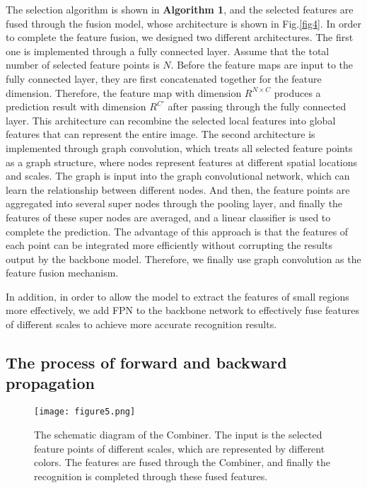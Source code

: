 \documentclass[conference]{IEEEtran}
\begin{document}
The selection algorithm is shown in \textbf{Algorithm 1}, and the selected features are fused through the fusion model, whose architecture is shown in Fig.\ref{fig4}. In order to complete the feature fusion, we designed two different architectures. The first one is implemented through a fully connected layer. Assume that the total number of selected feature points is $N$. Before the feature maps are input to the fully connected layer, they are first concatenated together for the feature dimension. Therefore, the feature map with dimension $ R^{N \times C} $  produces a prediction result with dimension $R^{C\prime}$ after passing through the fully connected layer. This architecture can recombine the selected local features into global features that can represent the entire image. The second architecture is implemented through graph convolution, which treats all selected feature points as a graph structure, where nodes represent features at different spatial locations and scales. The graph is input into the graph convolutional network, which can learn the relationship between different nodes. And then, the feature points are aggregated into several super nodes through the pooling layer, and finally the features of these super nodes are averaged, and a linear classifier is used to complete the prediction. The advantage of this approach is that the features of each point can be integrated more efficiently without corrupting the results output by the backbone model. Therefore, we finally use graph convolution as the feature fusion mechanism.

In addition, in order to allow the model to extract the features of small regions more effectively, we add FPN to the backbone network to effectively fuse features of different scales to achieve more accurate recognition results.


\subsection{The process of forward and backward propagation}

\begin{figure}[!tp]
\centerline{\texttt{[image: figure5.png]}}
\caption{The schematic diagram of the Combiner. The input is the selected feature points of different scales, which are represented by different colors. The features are fused through the Combiner, and finally the recognition is completed through these fused features.}
\label{fig5}
\end{figure}
\end{document}
